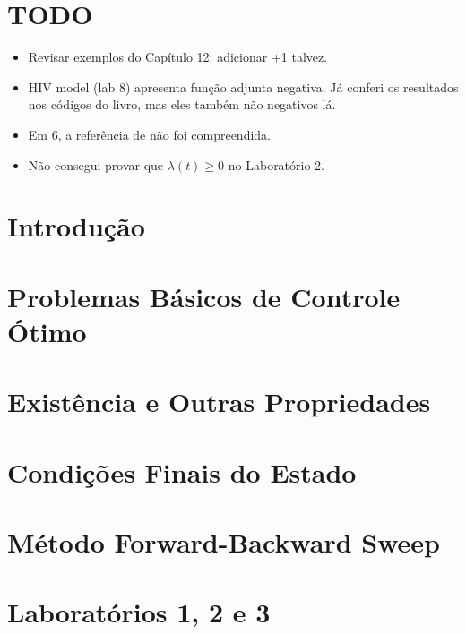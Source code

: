 \documentclass[a4paper, 11pt, oneside]{book}
\newcommand{\la}{\lambda}
\theoremstyle{definition}
\begin{document}


\tableofcontents

\chapter{TODO}

\begin{itemize}
    \item Revisar exemplos do Capítulo 12: adicionar +1 talvez. 
    \item HIV model (lab 8) apresenta função adjunta negativa. Já conferi os
    resultados nos códigos do livro, mas eles também não negativos lá. 
    \item Em \ref{ch:4}, a referência de \cite{wolfgang1978} não foi
    compreendida. 
    \item Não consegui provar que $\la(t) \ge 0$ no Laboratório 2. 
\end{itemize}

\chapter{Introdução}
\label{ch:intro}


\chapter{Problemas Básicos de Controle Ótimo}
\label{ch:1}


\chapter{Existência e Outras Propriedades}
\label{ch:2}


\chapter{Condições Finais do Estado}
\label{ch:3}


\chapter{Método Forward-Backward Sweep}
\label{ch:4}


\chapter{Laboratórios 1, 2 e 3}
\label{labs123}

\end{document}
